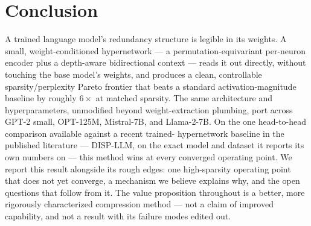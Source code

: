 \documentclass[11pt]{article}
\begin{document}
\section{Conclusion}
\label{sec:conclusion}

A trained language model's redundancy structure is legible in its weights.
A small, weight-conditioned hypernetwork --- a permutation-equivariant
per-neuron encoder plus a depth-aware bidirectional context --- reads it out
directly, without touching the base model's weights, and produces a clean,
controllable sparsity/perplexity Pareto frontier that beats a standard
activation-magnitude baseline by roughly $6\times$ at matched sparsity. The
same architecture and hyperparameters, unmodified beyond weight-extraction
plumbing, port across GPT-2 small, OPT-125M, Mistral-7B, and Llama-2-7B. On
the one head-to-head comparison available against a recent trained-
hypernetwork baseline in the published literature --- DISP-LLM, on the exact
model and dataset it reports its own numbers on --- this method wins at every
converged operating point. We report this result alongside its rough edges:
one high-sparsity operating point that does not yet converge, a mechanism we
believe explains why, and the open questions that follow from it. The value
proposition throughout is a better, more rigorously characterized
compression method --- not a claim of improved capability, and not a result
with its failure modes edited out.
\end{document}
